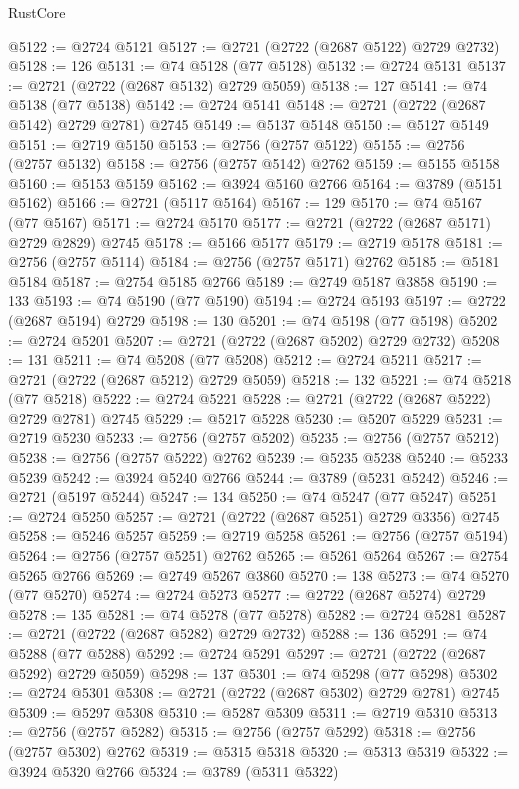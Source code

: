 \begin{lexlean}{RustCore}
\begin{coremodule}
@5122 := @2724 @5121
@5127 := @2721 (@2722 (@2687 @5122) @2729 @2732)
@5128 := 126
@5131 := @74 @5128 (@77 @5128)
@5132 := @2724 @5131
@5137 := @2721 (@2722 (@2687 @5132) @2729 @5059)
@5138 := 127
@5141 := @74 @5138 (@77 @5138)
@5142 := @2724 @5141
@5148 := @2721 (@2722 (@2687 @5142) @2729 @2781) @2745
@5149 := @5137 @5148
@5150 := @5127 @5149
@5151 := @2719 @5150
@5153 := @2756 (@2757 @5122)
@5155 := @2756 (@2757 @5132)
@5158 := @2756 (@2757 @5142) @2762
@5159 := @5155 @5158
@5160 := @5153 @5159
@5162 := @3924 @5160 @2766
@5164 := @3789 (@5151 @5162)
@5166 := @2721 (@5117 @5164)
@5167 := 129
@5170 := @74 @5167 (@77 @5167)
@5171 := @2724 @5170
@5177 := @2721 (@2722 (@2687 @5171) @2729 @2829) @2745
@5178 := @5166 @5177
@5179 := @2719 @5178
@5181 := @2756 (@2757 @5114)
@5184 := @2756 (@2757 @5171) @2762
@5185 := @5181 @5184
@5187 := @2754 @5185 @2766
@5189 := @2749 @5187 @3858
@5190 := 133
@5193 := @74 @5190 (@77 @5190)
@5194 := @2724 @5193
@5197 := @2722 (@2687 @5194) @2729
@5198 := 130
@5201 := @74 @5198 (@77 @5198)
@5202 := @2724 @5201
@5207 := @2721 (@2722 (@2687 @5202) @2729 @2732)
@5208 := 131
@5211 := @74 @5208 (@77 @5208)
@5212 := @2724 @5211
@5217 := @2721 (@2722 (@2687 @5212) @2729 @5059)
@5218 := 132
@5221 := @74 @5218 (@77 @5218)
@5222 := @2724 @5221
@5228 := @2721 (@2722 (@2687 @5222) @2729 @2781) @2745
@5229 := @5217 @5228
@5230 := @5207 @5229
@5231 := @2719 @5230
@5233 := @2756 (@2757 @5202)
@5235 := @2756 (@2757 @5212)
@5238 := @2756 (@2757 @5222) @2762
@5239 := @5235 @5238
@5240 := @5233 @5239
@5242 := @3924 @5240 @2766
@5244 := @3789 (@5231 @5242)
@5246 := @2721 (@5197 @5244)
@5247 := 134
@5250 := @74 @5247 (@77 @5247)
@5251 := @2724 @5250
@5257 := @2721 (@2722 (@2687 @5251) @2729 @3356) @2745
@5258 := @5246 @5257
@5259 := @2719 @5258
@5261 := @2756 (@2757 @5194)
@5264 := @2756 (@2757 @5251) @2762
@5265 := @5261 @5264
@5267 := @2754 @5265 @2766
@5269 := @2749 @5267 @3860
@5270 := 138
@5273 := @74 @5270 (@77 @5270)
@5274 := @2724 @5273
@5277 := @2722 (@2687 @5274) @2729
@5278 := 135
@5281 := @74 @5278 (@77 @5278)
@5282 := @2724 @5281
@5287 := @2721 (@2722 (@2687 @5282) @2729 @2732)
@5288 := 136
@5291 := @74 @5288 (@77 @5288)
@5292 := @2724 @5291
@5297 := @2721 (@2722 (@2687 @5292) @2729 @5059)
@5298 := 137
@5301 := @74 @5298 (@77 @5298)
@5302 := @2724 @5301
@5308 := @2721 (@2722 (@2687 @5302) @2729 @2781) @2745
@5309 := @5297 @5308
@5310 := @5287 @5309
@5311 := @2719 @5310
@5313 := @2756 (@2757 @5282)
@5315 := @2756 (@2757 @5292)
@5318 := @2756 (@2757 @5302) @2762
@5319 := @5315 @5318
@5320 := @5313 @5319
@5322 := @3924 @5320 @2766
@5324 := @3789 (@5311 @5322)

\end{coremodule}
\end{lexlean}
